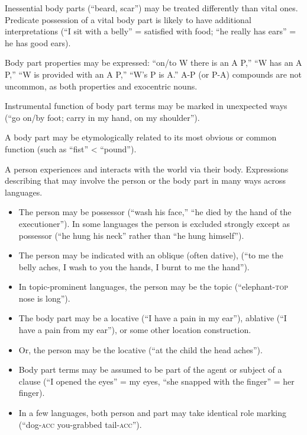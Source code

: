 \documentclass[11pt]{article}
\newcommand{\I}[1]{\textsc{#1}}   %
\newenvironment{grammarlist}%
 {\begin{itemize}\addtolength{\itemsep}{-0.5\baselineskip}\ignorespaces}%
 {\end{itemize}\ignorespacesafterend}
\begin{document}
Inessential body parts (``beard, scar'') may be treated differently
than vital ones.  Predicate possession of a vital body part is likely
to have additional interpretations (``I sit with a belly'' = satisfied
with food; ``he really has ears'' = he has good ears).

Body part properties may be expressed: ``on/to W there is an A P,''
``W has an A P,'' ``W is provided with an A P,'' ``W's P is A.''  A-P
(or P-A) compounds are not uncommon, as both properties and exocentric
nouns. 

Instrumental function of body part terms may be marked in unexpected
ways (``go on/by foot; carry in my hand, on my shoulder'').

A body part may be etymologically related to its most obvious or
common function (such as ``fist'' < ``pound'').

A person experiences and interacts with the world via their body.
Expressions describing that may involve the person or the body part in
many ways across languages.

\begin{grammarlist}
  \item The person may be possessor (``wash his face,'' ``he died by
    the hand of the executioner'').  In some languages the person is
    excluded strongly except as possessor (``he hung his neck'' rather
    than ``he hung himself'').
  \item The person may be indicated with an oblique (often dative),
    (``to me the belly aches, I wash to you the hands, I burnt to me
    the hand'').
  \item In topic-prominent languages, the person may be the topic
    (``elephant-\I{top} nose is long'').
  \item The body part may be a locative (``I have a pain in my ear''),
    ablative (``I have a pain from my ear''), or some other location
    construction.
  \item Or, the person may be the locative (``at the child the head
    aches'').
  \item Body part terms may be assumed to be part of the agent or
    subject of a clause (``I opened the eyes'' = my eyes, ``she
    snapped with the finger'' = her finger).
  \item In a few languages, both person and part may take identical
    role marking (``dog-\I{acc} you-grabbed tail-\I{acc}'').
\end{grammarlist}

\end{document}

